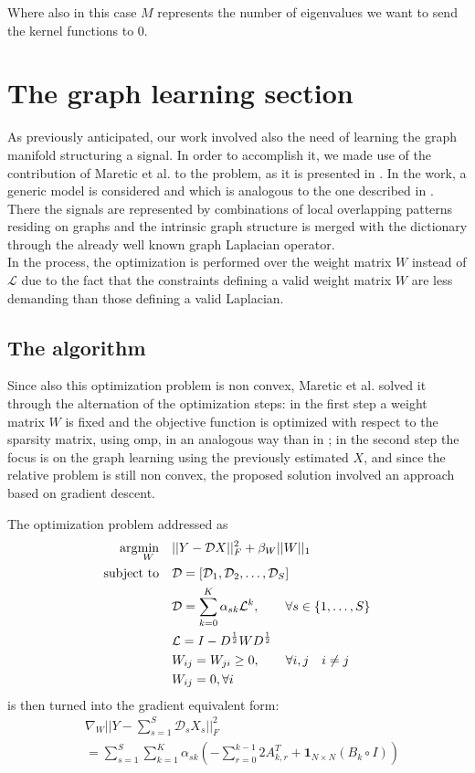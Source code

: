 Where also in this case $M$ represents the number of eigenvalues we want to send the kernel functions to 0.

\section{The graph learning section}
As previously anticipated, our work involved also the need of learning the graph manifold structuring a signal. In order to accomplish it, we made use of the contribution of Maretic et al. to the problem, as it is presented in \cite{Maretic2017}. In the work, a generic model is considered and which is analogous to the one described in \cite {Thanou2014}. There the signals are represented by combinations of local overlapping patterns residing on graphs and the intrinsic graph structure is merged with the dictionary through the already well known graph Laplacian operator.\\
In the process, the optimization is performed over the weight matrix $W$ instead of $\mathcal{L}$ due to the fact that the constraints defining a valid weight matrix $W$ are less demanding than those defining a valid Laplacian.

\subsection{The algorithm}
Since also this optimization problem is non convex, Maretic et al. solved it through the alternation of the optimization steps: in the first step a weight matrix $W$ is fixed and the objective function is optimized with respect to the sparsity matrix, using \gls{omp}, in an analogous way than in \cite{Thanou2014}; in the second step the focus is on the graph learning using the previously estimated $X$, and since the relative problem is still non convex, the proposed solution involved an approach based on gradient descent.

The optimization problem addressed as
\begin{align}
\arg\!\min_W \quad &||Y - \mathcal{D}X||_F^2 + \beta_W ||W||_1\\
\text{subject to} \quad &\mathcal{D} = [\mathcal{D}_1,\mathcal{D}_2,\dots,\mathcal{D}_S]\\
                        &\mathcal{D} = \sum_{k=0}^{K}\alpha_{sk}\mathcal{L}^k, \qquad \forall s \in \{1,\dots,S\}\\
                        &\mathcal{L} = I - D^{\frac{1}{2}}WD^{\frac{1}{2}}\\
                        &W_{ij} = W_{ji} \geq 0, \qquad \forall i,j \quad i \ne j\\
                        &W_{ij} = 0, \forall i
\end{align}
is then turned into the gradient equivalent form:
\begin{equation}
\begin{split}
&\nabla_W ||Y - \sum_{s=1}^{S}\mathcal{D}_s X_s||_F^2\\
&= \sum_{s=1}^S \sum_{k=1}^K \alpha_{sk} (- \sum_{r = 0}^{k-1}2A^T_{k,r}+\textbf{1}_{N\times N}(B_k \circ I))
\end{split}
\end{equation}

